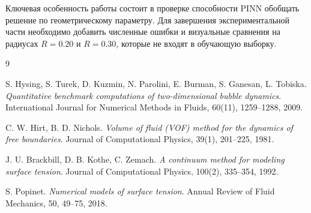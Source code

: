 \documentclass[12pt,a4paper]{article}
\begin{document}
Ключевая особенность работы состоит в проверке способности PINN обобщать решение
по геометрическому параметру. Для завершения экспериментальной части необходимо
добавить численные ошибки и визуальные сравнения на радиусах \(R=0.20\) и
\(R=0.30\), которые не входят в обучающую выборку.

\begin{thebibliography}{9}

S. Hysing, S. Turek, D. Kuzmin, N. Parolini, E. Burman, S. Ganesan, L. Tobiska.
\textit{Quantitative benchmark computations of two-dimensional bubble dynamics}.
International Journal for Numerical Methods in Fluids, 60(11), 1259--1288, 2009.

C. W. Hirt, B. D. Nichols.
\textit{Volume of fluid (VOF) method for the dynamics of free boundaries}.
Journal of Computational Physics, 39(1), 201--225, 1981.

J. U. Brackbill, D. B. Kothe, C. Zemach.
\textit{A continuum method for modeling surface tension}.
Journal of Computational Physics, 100(2), 335--354, 1992.

S. Popinet.
\textit{Numerical models of surface tension}.
Annual Review of Fluid Mechanics, 50, 49--75, 2018.

\end{thebibliography}
\end{document}
